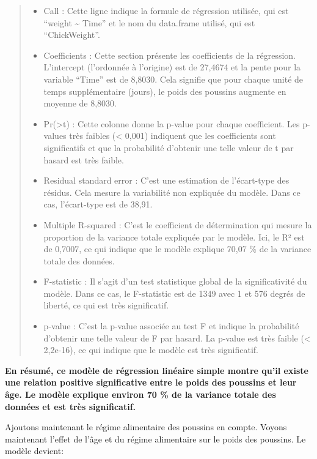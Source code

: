 \documentclass[
]{article}
\providecommand{\tightlist}{%
  \setlength{\itemsep}{0pt}\setlength{\parskip}{0pt}}
\begin{document}
\begin{quote}
\begin{itemize}
\tightlist
\item
  Call : Cette ligne indique la formule de régression utilisée, qui est ``weight \textasciitilde{} Time'' et le nom du data.frame utilisé, qui est ``ChickWeight''.
\item
  Coefficients : Cette section présente les coefficients de la régression. L'intercept (l'ordonnée à l'origine) est de 27,4674 et la pente pour la variable ``Time'' est de 8,8030. Cela signifie que pour chaque unité de temps supplémentaire (jours), le poids des poussins augmente en moyenne de 8,8030.
\item
  Pr(\textgreater\textbar t\textbar) : Cette colonne donne la p-value pour chaque coefficient. Les p-values très faibles (\textless{} 0,001) indiquent que les coefficients sont significatifs et que la probabilité d'obtenir une telle valeur de t par hasard est très faible.
\item
  Residual standard error : C'est une estimation de l'écart-type des résidus. Cela mesure la variabilité non expliquée du modèle. Dans ce cas, l'écart-type est de 38,91.
\item
  Multiple R-squared : C'est le coefficient de détermination qui mesure la proportion de la variance totale expliquée par le modèle. Ici, le R² est de 0,7007, ce qui indique que le modèle explique 70,07 \% de la variance totale des données.
\item
  F-statistic : Il s'agit d'un test statistique global de la significativité du modèle. Dans ce cas, le F-statistic est de 1349 avec 1 et 576 degrés de liberté, ce qui est très significatif.
\item
  p-value : C'est la p-value associée au test F et indique la probabilité d'obtenir une telle valeur de F par hasard. La p-value est très faible (\textless{} 2,2e-16), ce qui indique que le modèle est très significatif.
\end{itemize}
\end{quote}

\textbf{En résumé, ce modèle de régression linéaire simple montre qu'il existe une relation positive significative entre le poids des poussins et leur âge. Le modèle explique environ 70 \% de la variance totale des données et est très significatif.}

Ajoutons maintenant le régime alimentaire des poussins en compte. Voyons maintenant l'effet de l'âge et du régime alimentaire sur le poids des poussins.
Le modèle devient:
\end{document}
